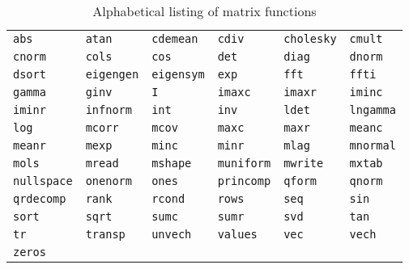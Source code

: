 \begin{table}[p]
\centering
\begin{tabular}{llllll}
\texttt{abs}       &
\texttt{atan}      &
\texttt{cdemean}   &
\texttt{cdiv}      &
\texttt{cholesky}  &
\texttt{cmult}     \\
\texttt{cnorm}     & 
\texttt{cols}      & 
\texttt{cos}       & 
\texttt{det}       & 
\texttt{diag}      & 
\texttt{dnorm}     \\
\texttt{dsort}     & 
\texttt{eigengen}  & 
\texttt{eigensym}  & 
\texttt{exp}       & 
\texttt{fft}       & 
\texttt{ffti}      \\
\texttt{gamma}     & 
\texttt{ginv}      & 
\texttt{I}         & 
\texttt{imaxc}     & 
\texttt{imaxr}     & 
\texttt{iminc}     \\
\texttt{iminr}     & 
\texttt{infnorm}   & 
\texttt{int}       & 
\texttt{inv}       & 
\texttt{ldet}      & 
\texttt{lngamma}   \\
\texttt{log}       & 
\texttt{mcorr}     & 
\texttt{mcov}      & 
\texttt{maxc}      &   
\texttt{maxr}      & 
\texttt{meanc}     \\
\texttt{meanr}     & 
\texttt{mexp}      & 
\texttt{minc}      &  
\texttt{minr}      & 
\texttt{mlag}      & 
\texttt{mnormal}   \\
\texttt{mols}      & 
\texttt{mread}     & 
\texttt{mshape}    & 
\texttt{muniform}  & 
\texttt{mwrite}    & 
\texttt{mxtab}     \\
\texttt{nullspace} & 
\texttt{onenorm}   & 
\texttt{ones}      & 
\texttt{princomp}  & 
\texttt{qform}     & 
\texttt{qnorm}     \\
\texttt{qrdecomp}  & 
\texttt{rank}      & 
\texttt{rcond}     & 
\texttt{rows}      & 
\texttt{seq}       & 
\texttt{sin}       \\
\texttt{sort}      & 
\texttt{sqrt}      & 
\texttt{sumc}      & 
\texttt{sumr}      & 
\texttt{svd}       & 
\texttt{tan}       \\
\texttt{tr}        & 
\texttt{transp}    & 
\texttt{unvech}    & 
\texttt{values}    & 
\texttt{vec}       & 
\texttt{vech}      \\
\texttt{zeros}    
\end{tabular}      
\caption{Alphabetical listing of matrix functions}
\label{tab:matrix_funcs}
\end{table}

